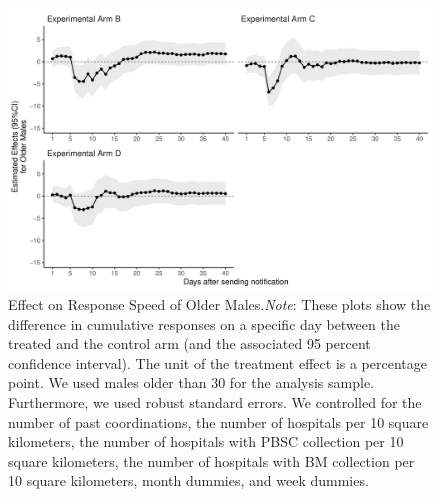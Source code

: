 \documentclass [12pt, a4paper]{article}
\begin{document}
\begin{figure}[H]
\includegraphics{JMDP RCT - Main Document_files/figure-latex/old-male-flow-1} \caption{Effect on Response Speed of Older Males.\newline \emph{Note}: These plots show the difference in cumulative responses on a specific day between the treated and the control arm (and the associated 95 percent confidence interval). The unit of the treatment effect is a percentage point. We used males older than 30 for the analysis sample. Furthermore,  we used robust standard errors. We controlled for the number of past coordinations, the number of hospitals per 10 square kilometers, the number of hospitals with PBSC collection per 10 square kilometers, the number of hospitals with BM collection per 10 square kilometers, month dummies, and week dummies.}\label{fig:old-male-flow}
\end{figure}
\end{document}
